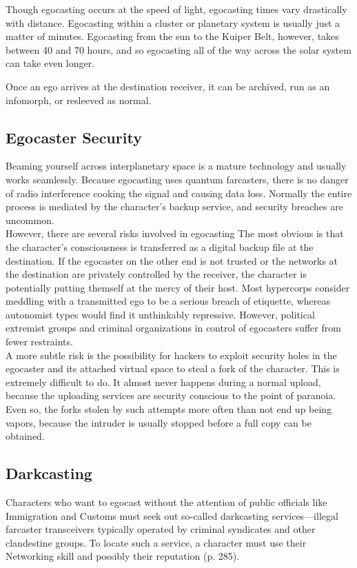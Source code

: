 Though egocasting occurs at the speed of light, egocasting times vary drastically with distance. Egocasting within a cluster or planetary system is usually just a matter of minutes. Egocasting from the sun to the Kuiper Belt, however, takes between 40 and 70 hours, and so egocasting all of the way across the solar system can take even longer. 

Once an ego arrives at the destination receiver, it can be archived, run as an infomorph, or resleeved as normal. 

\subsection{Egocaster Security} 

Beaming yourself across interplanetary space is a mature technology and usually works seamlessly. Because egocasting uses quantum farcasters, there is no danger of radio interference cooking the signal and causing data loss. Normally the entire process is mediated by the character's backup service, and security breaches are uncommon. \\ However, there are several risks involved in egocasting The most obvious is that the character's consciousness is transferred as a digital backup file at the destination. If the egocaster on the other end is not trusted or the networks at the destination are privately controlled by the receiver, the character is potentially putting themself at the mercy of their host. Most hypercorps consider meddling with a transmitted ego to be a serious breach of etiquette, whereas autonomist types would find it unthinkably repressive. However, political extremist groups and criminal organizations in control of egocasters suffer from fewer restraints. \\ A more subtle risk is the possibility for hackers to exploit security holes in the egocaster and its attached virtual space to steal a fork of the character. This is extremely difficult to do. It almost never happens during a normal upload, because the uploading services are security conscious to the point of paranoia. Even so, the forks stolen by such attempts more often than not end up being vapors, because the intruder is usually stopped before a full copy can be obtained. 

\subsection{Darkcasting} 

Characters who want to egocast without the attention of public officials like Immigration and Customs must seek out so-called darkcasting services—illegal farcaster transceivers typically operated by criminal syndicates and other clandestine groups. To locate such a service, a character must use their Networking skill and possibly their reputation (p. 285). 

